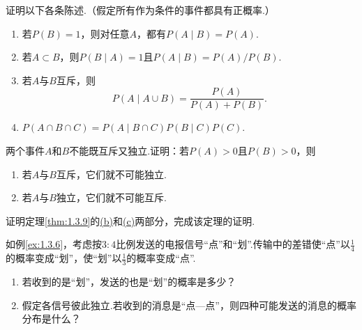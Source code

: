 \begin{exercise}\label{exercise:1.38}
证明以下各条陈述.（假定所有作为条件的事件都具有正概率.）
\begin{enumerate}
\item[(a)] 若$P(B)=1$，则对任意$A$，都有$P(A\mid B)=P(A)$.
\item[(b)] 若$A\subset B$，则$P(B\mid A)=1$且$P(A\mid B)=P(A)/P(B)$.
\item[(c)] 若$A$与$B$互斥，则
$$
P(A\mid A\cup B)=\frac{P(A)}{P(A)+P(B)}.
$$
\item[(d)] $P(A\cap B\cap C)=P(A\mid B\cap C)P(B\mid C)P(C)$.
\end{enumerate}
\end{exercise}

\begin{exercise}\label{exercise:1.39}
两个事件$A$和$B$不能既互斥又独立.证明：若$P(A)>0$且$P(B)>0$，则
\begin{enumerate}
\item[(a)] 若$A$与$B$互斥，它们就不可能独立.
\item[(b)] 若$A$与$B$独立，它们就不可能互斥.
\end{enumerate}
\end{exercise}

\begin{exercise}\label{exercise:1.40}
证明定理\ref{thm:1.3.9}的\hyperref[item:1.3.9b]{(b)}和\hyperref[item:1.3.9c]{(c)}两部分，完成该定理的证明.
\end{exercise}

\begin{exercise}\label{exercise:1.41}
如例\ref{ex:1.3.6}，考虑按$3:4$比例发送的电报信号“点”和“划”.传输中的差错使“点”以$\frac14$的概率变成“划”，使“划”以$\frac13$的概率变成“点”.
\begin{enumerate}
\item[(a)] 若收到的是“划”，发送的也是“划”的概率是多少？
\item[(b)] 假定各信号彼此独立.若收到的消息是“点—点”，则四种可能发送的消息的概率分布是什么？
\end{enumerate}
\end{exercise}

